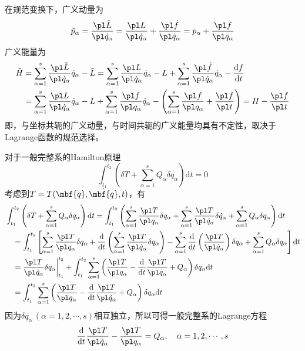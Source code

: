 在规范变换下，广义动量为
\begin{equation*}
	\tilde{p}_\alpha = \frac{\pl \tilde{L}}{\pl \dot{q}_\alpha} = \frac{\pl L}{\pl \dot{q}_\alpha} + \frac{\pl \dot{f}}{\pl \dot{q}_\alpha} = p_\alpha + \frac{\pl f}{\pl q_\alpha}
\end{equation*}
广义能量为
\begin{align*}
	\tilde{H} & = \sum_{\alpha=1}^s \frac{\pl \tilde{L}}{\pl \dot{q}_\alpha} \dot{q}_\alpha - \tilde{L} = \sum_{\alpha=1}^s \frac{\pl L}{\pl \dot{q}_\alpha} \dot{q}_\alpha - L + \sum_{\alpha=1}^s \frac{\pl \dot{f}}{\pl \dot{q}_\alpha} \dot{q}_\alpha - \frac{\mathrm{d} f}{\mathrm{d} t} \\
	& = \sum_{\alpha=1}^s \frac{\pl L}{\pl \dot{q}_\alpha} \dot{q}_\alpha - L + \sum_{\alpha=1}^s \frac{\pl f}{\pl q_\alpha} \dot{q}_\alpha - \left(\sum_{\alpha=1}^s \frac{\pl f}{\pl q_\alpha} + \frac{\pl f}{\pl t}\right) = H - \frac{\pl f}{\pl t}
\end{align*}
即，与坐标共轭的广义动量，与时间共轭的广义能量均具有不定性，取决于Lagrange函数的规范选择。

对于一般完整系的Hamilton原理
\begin{equation*}
	\int_{t_1}^{t_2} \left(\delta T + \sum_{\alpha=1}^s Q_\alpha \delta q_\alpha\right) \mathrm{d} t = 0
\end{equation*}
考虑到$T = T(\mbf{q},\dot{\mbf{q}},t)$，有
\begin{align*}
	& \int_{t_1}^{t_2} \left(\delta T + \sum_{\alpha=1}^s Q_\alpha \delta q_\alpha\right) \mathrm{d} t = \int_{t_1}^{t_2} \left(\sum_{\alpha=1}^s \frac{\pl T}{\pl q_\alpha} \delta q_\alpha + \sum_{\alpha=1}^s \frac{\pl T}{\pl \dot{q}_\alpha} \delta \dot{q}_\alpha + \sum_{\alpha=1}^s Q_\alpha \delta q_\alpha\right) \mathrm{d} t \\
	& \quad = \int_{t_1}^{t_2} \left[\sum_{\alpha=1}^s \frac{\pl T}{\pl q_\alpha} \delta q_\alpha + \frac{\mathrm{d}}{\mathrm{d} t} \left(\sum_{\alpha=1}^s \frac{\pl T}{\pl \dot{q}_\alpha} \delta q_\alpha\right) - \sum_{\alpha=1}^s \frac{\mathrm{d}}{\mathrm{d} t} \left(\frac{\pl T}{\pl \dot{q}_\alpha}\right) \delta q_\alpha + \sum_{\alpha=1}^s Q_\alpha \delta q_\alpha \right] \mathrm{d} t \\
	& \quad = \frac{\pl T}{\pl \dot{q}_\alpha} \delta q_\alpha\bigg|_{t_1}^{t_2} + \int_{t_1}^{t_2} \sum_{\alpha=1}^s \left(\frac{\pl T}{\pl q_\alpha} - \frac{\mathrm{d}}{\mathrm{d} t} \frac{\pl T}{\pl \dot{q}_\alpha} + Q_\alpha\right) \delta q_\alpha \mathrm{d} t \\
	& \quad = \int_{t_1}^{t_2} \sum_{\alpha=1}^s \left(\frac{\pl T}{\pl q_\alpha} - \frac{\mathrm{d}}{\mathrm{d} t} \frac{\pl T}{\pl \dot{q}_\alpha} + Q_\alpha\right) \delta q_\alpha \mathrm{d} t
\end{align*}
因为$\delta q_\alpha\,(\alpha=1,2,\cdots,s)$相互独立，所以可得{\heiti 一般完整系的Lagrange方程}
\begin{equation}
	\frac{\mathrm{d}}{\mathrm{d} t} \frac{\pl T}{\pl \dot{q}_\alpha} - \frac{\pl T}{\pl q_\alpha} = Q_\alpha,\quad \alpha = 1,2,\cdots,s
\end{equation}

